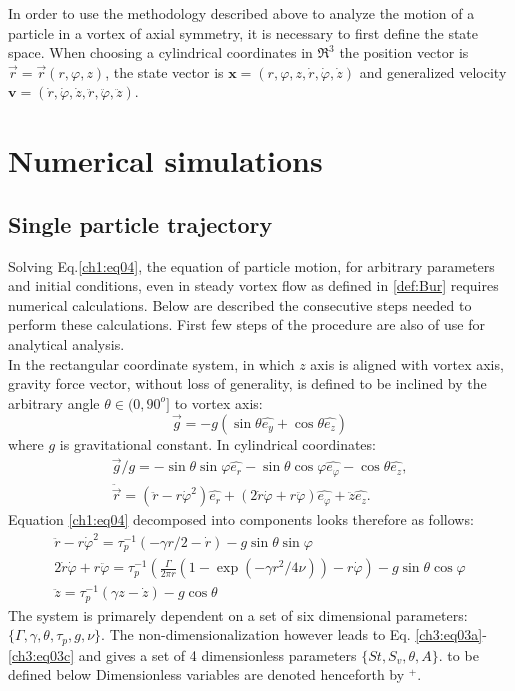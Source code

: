 \documentclass[../main.tex]{subfiles}
\begin{document}
In order to use the methodology described above to analyze the motion of a particle in a vortex of axial symmetry, it is necessary to first define the state space. When choosing a cylindrical coordinates in $\Re^3$ the position vector is $\vec{r}=\vec{r}(r,\varphi,z)$, the state vector is $\mathbf{x}=(r,\varphi,z,\dot{r},\dot{\varphi},\dot{z})$ and generalized velocity $\mathbf{v}=(\dot{r},\dot{\varphi},\dot{z},\ddot{r},\ddot{\varphi},\ddot{z})$.\\

\section{Numerical simulations}
\label{ch2s3}

 \subsection{Single particle trajectory}
Solving Eq.\ref{ch1:eq04}, the equation of particle motion, for arbitrary parameters and initial conditions, even in steady vortex flow as defined in \ref{def:Bur} requires numerical calculations. Below are described the consecutive steps needed to perform these calculations. First few steps of the procedure are also of use for analytical analysis.\\
In the rectangular coordinate system, in which $z$ axis is aligned with vortex axis, gravity force vector, without loss of generality, is defined to be inclined by the arbitrary angle $\theta \in (0, 90^o]$ to vortex axis:
\begin{equation}
\vec{g}=-g\left(\sin\theta \hat{e_y}+\cos\theta\hat{e_z}\right)
\end{equation}
where $g$ is gravitational constant. In cylindrical coordinates:
\begin{align}
\vec{g}/g=-\sin{\theta} \sin{\varphi} \hat{e_r}-\sin{\theta} \cos{\varphi}\hat{e_{\varphi}}-\cos{\theta} \hat{e_z},\\\ddot{\vec{r}}=(\ddot{r}-r \dot{\varphi}^2) \hat{e_r}+(2 \dot{r} \dot{\varphi} +r \ddot{\varphi})\hat{e_{\varphi}}+\ddot{z} \hat{e_z}.
\label{ch2:eq01}
\end{align}
Equation \ref{ch1:eq04} decomposed into components looks therefore as follows:
\begin{align}
\ddot{r}-r \dot{\varphi}^2=\tau_p^{-1}\left(-\gamma r/2-\dot{r} \right)-g \sin{\theta} \sin{\varphi}\\
2 \dot{r} \dot{\varphi} +r \ddot{\varphi} = \tau_p^{-1}\left( \frac{\Gamma}{2 \pi r} \left(1-\exp(-\gamma r^2/4\nu)\right)-r\dot{\varphi}\right) - g \sin{\theta} \cos{\varphi}\\
\ddot{z}=\tau_p^{-1}\left(\gamma z - \dot{z}\right) - g \cos{\theta}
\label{ch2:eq02}
\end{align}
The system is primarely dependent on a set of six dimensional parameters: $\{\Gamma, \gamma, \theta, \tau_p, g, \nu \}$. The non-dimensionalization however leads to Eq. \ref{ch3:eq03a}-\ref{ch3:eq03c} and gives a set of 4 dimensionless parameters $\{St, S_v, \theta, A \}$. to be defined below Dimensionless variables are denoted henceforth by $^{+}$.
\end{document}
